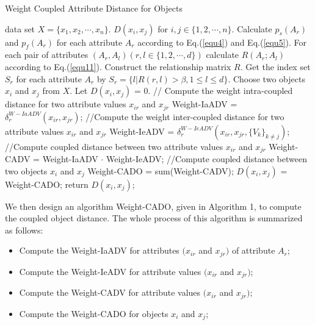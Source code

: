 \documentclass[review]{elsarticle}
\begin{document}
\begin{algorithm}[!ht]
  \caption{Weight Coupled Attribute Distance for Objects}
  \label{alg:Weight-CADO}
  \begin{algorithmic}[1]
    data set ${X = \{x_1,x_2,\cdots,x_n\}}$.
    ${D(x_i,x_j)}$ for ${i,j \in \{1,2,\cdots,n\}}$.
   \STATE Calculate ${p_s(A_r)}$ and ${p_f(A_r)}$ for each attribute ${A_r}$ according to Eq.(\ref{equ4}) and Eq.(\ref{equ5}).
   \STATE For each pair of attributes ${(A_r,A_l)(r,l \in \{1,2,\cdots,d\})}$ calculate ${R(A_r;A_l)}$ according to Eq.(\ref{equ11}).
   \STATE Construct the relationship matrix ${R}$.
   \STATE Get the index set ${S_r}$ for each attribute ${A_r}$ by ${S_r = \{l|R(r,l) > \beta, 1 \leq l \leq d\}}$.
   \STATE Choose two objects ${x_i}$ and ${x_j}$ from ${X}$.
   \STATE Let ${D(x_i,x_j)}$ = 0.
   \STATE // Compute the weight intra-coupled distance for two attribute values $x_{ir}$ and $x_{jr}$
   \STATE Weight-IaADV = $\delta_{r}^{W-IaADV}(x_{ir},x_{jr})$;
   \STATE //Compute the weight inter-coupled distance for two attribute values $x_{ir}$ and $x_{jr}$
   \STATE Weight-IeADV = $\delta_{r}^{W-IeADV}(x_{ir},x_{jr},\{V_k\}_{k \neq j})$;
   \ENDFOR
   \STATE //Compute coupled distance between two attribute values $x_{ir}$ and $x_{jr}$
   \STATE Weight-CADV = Weight-IaADV $\cdot$ Weight-IeADV;
   \ENDFOR
   \STATE //Compute coupled distance between two objects $x_{i}$ and $x_{j}$
   \STATE Weight-CADO = sum(Weight-CADV);
   \STATE ${D(x_i,x_j)}$ = Weight-CADO;
   \STATE return ${D(x_i,x_j)}$;
\end{algorithmic}
\end{algorithm}
We then design an algorithm Weight-CADO, given in Algorithm 1, to compute the coupled object distance. The whole process of this algorithm is summarized as follows:
\begin{itemize}
  \item Compute the Weight-IaADV for attributes $(x_{ir}$ and $x_{jr})$ of attribute $A_r$;
  \item Compute the Weight-IeADV for attribute values $(x_{ir}$ and $x_{jr})$;
  \item Compute the Weight-CADV for attribute values $(x_{ir}$ and $x_{jr})$;
  \item Compute the Weight-CADO for objects $x_{i}$ and $x_{j}$;
\end{itemize}
\end{document}
